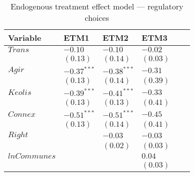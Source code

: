 \begin{table}[ht]
    \centering
    \caption{Endogenous treatment effect model — regulatory choices}
    \label{tab:reg_results}
    \begin{tabular}{llllll}
    \toprule
    \textbf{Variable} & \textbf{ETM1} & \textbf{ETM2} & \textbf{ETM3}\\
    \midrule
    $Trans$ & $-0.10$ & $-0.10$&  $-0.02$  \\
              & $(0.13)$ & $(0.14)$ & $(0.03)$  \\[6pt]
    $Agir$ & $-0.37^{***}$ & $-0.38^{***}$ & $-0.31$  \\
               & $(0.13)$ & $(0.14)$ & $(0.39)$  \\[6pt]
    $Keolis$ & $-0.39^{***}$ & $-0.41^{***}$ & $-0.33$  \\
               & $(0.13)$ & $(0.13)$ & $(0.41)$  \\[6pt]
    $Connex$ & $-0.51^{***}$ & $-0.51^{***}$ & $-0.45$  \\
               & $(0.13)$ & $(0.14)$ & $(0.41)$  \\[6pt]
    $Right$ &  & $-0.03$ & $-0.03$  \\
               &  & $(0.02)$ & $(0.03)$  \\[6pt]
    $lnCommunes$ & & & $0.04$  \\
               &  & & $(0.03)$ \\[6pt]
    \midrule
    \bottomrule
    \end{tabular}
    \end{table}